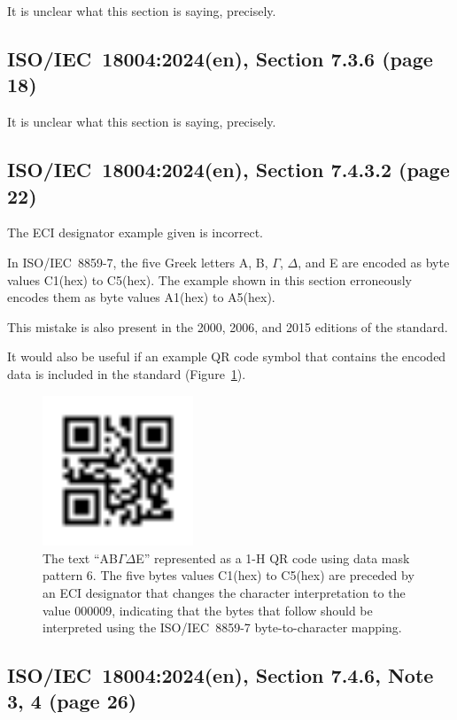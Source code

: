 \documentclass[a4paper,twoside]{article}
\newcommand{\shortstandard}{ISO/IEC~18004}
\newcommand{\standard}{\shortstandard:2024(en)}
\newcommand{\hex}[1]{#1(hex)}
\begin{document}
It is unclear what this section is saying, precisely.

\subsection{\standard, Section 7.3.6 (page 18)}

It is unclear what this section is saying, precisely.

\subsection{\standard, Section 7.4.3.2 (page 22)}

The ECI designator example given is incorrect.

In ISO/IEC~8859-7, the five Greek letters A, B, $\Gamma$, $\Delta$, and E are encoded as byte values \hex{C1} to \hex{C5}.
The example shown in this section erroneously encodes them as byte values \hex{A1} to \hex{A5}.

This mistake is also present in the 2000, 2006, and 2015 editions of the standard.

It would also be useful if an example QR code symbol that contains the encoded data is included in the standard (Figure~\ref{fig:greek-encoding}).

\begin{figure}[h]
\centering
\includegraphics[width=0.4\textwidth]{images/qrcode_iso18004_2024_QRCodeSymbol_1Mp6.png}
\caption{The text ``AB$\mathit{\Gamma\Delta}$E'' represented as a 1-H QR code using data mask pattern 6.
         The five bytes values \hex{C1} to \hex{C5} are preceded by an ECI designator that changes the character
         interpretation to the value 000009, indicating that the bytes that follow should be interpreted using
         the ISO/IEC~8859-7 byte-to-character mapping.}
\label{fig:greek-encoding}
\end{figure}

\subsection{\standard, Section 7.4.6, Note 3, 4 (page 26)}
\end{document}

